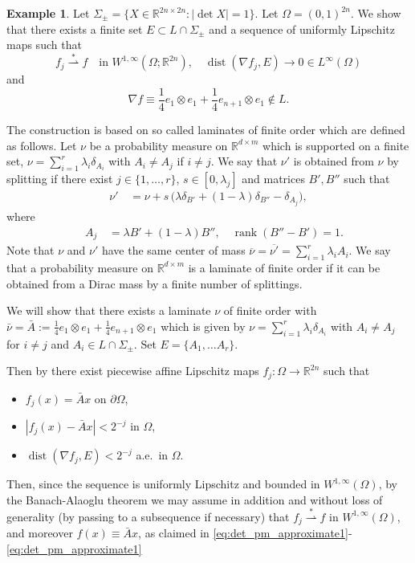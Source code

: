 \documentclass[titlepage]{amsart}
\numberwithin{equation}{section}
\theoremstyle{plain}
\theoremstyle{definition}
\newtheorem{example}[equation]{Example}
\theoremstyle{remark}
\newcommand{\dist}{\operatorname{dist}}
\newcommand{\R}{\mathbb{R}}
\newcommand{\rank}{\operatorname{rank}}
\newcommand{\g}{\nabla }
\begin{document}
\begin{example}  \label{ex:det_pm_approximate}
Let $\Sigma_\pm = \{ X \in \R^{2n \times 2n} : |\det X| = 1\}$. Let $\Omega = (0,1)^{2n}$. 
We show that there exists a finite set $E \subset L \cap \Sigma_\pm$ and a sequence of uniformly Lipschitz maps such that
\begin{equation}  \label{eq:det_pm_approximate1}  f_j \overset{*}{\rightharpoonup} f \quad \text{in $W^{1, \infty}(\Omega; \R^{2n})$}, 
\quad 
\dist(\g f_j, E) \to 0 \in L^\infty(\Omega)
\end{equation}
and 
\begin{equation} \label{eq:det_pm_approximate2} \g f \equiv \frac14 e_1 \otimes e_1 + \frac14 e_{n+1} \otimes e_1 \notin L.
\end{equation}

The construction is based on so called laminates of finite order which are defined as follows.
Let $\nu$ be a probability measure on $\R^{d \times m}$ which is supported on a finite set, $\nu = \sum_{i=1}^r \lambda_i \delta_{A_i}$
with $A_i \ne A_j$ if $i \ne j$. 
We say that $\nu'$ is obtained from $\nu$ by splitting if there exist  $j \in \{1, \ldots, r\}$, $s \in [0, \lambda_j]$ and 
matrices $B', B''$ such that 
\begin{align*}
\nu' & \, = \nu +  s  \, \big(  \lambda \delta_{B'} + (1- \lambda) \delta_{B''} - \delta_{A_j}  \big),
\end{align*}
where
\begin{align*}\quad A_j & \, = \lambda B' + (1-\lambda) B'', \quad \rank (B''-B') = 1.
\end{align*}
Note that $\nu$ and $\nu'$ have the same center of mass $\overline \nu = \overline{\nu'}  =\sum_{i=1}^r  \lambda_i A_i$.
We say that a probability measure on $\R^{d \times m}$ is a  laminate of finite order  if it can be obtained from a Dirac mass by a finite number of splittings.

We will show that there exists a laminate $\nu$ of finite order with $\bar \nu = 
 \bar A := \frac14 e_1 \otimes e_1 + \frac14 e_{n+1} \otimes e_1$
 which is given by 
$\nu = \sum_{i=1}^r \lambda_i \delta_{A_i}$ with $A_i \ne A_j$ for $i \ne j$ and $A_i \in L \cap \Sigma_\pm$. 
Set $E = \{ A_1, \ldots A_r\}$.

Then by \cite[Lemma 3.2]{muller_sverak03}  there exist  piecewise affine Lipschitz  maps
$f_j : \Omega \to \R^{2n}$ such that 
\begin{itemize}
    \item $f_j(x)=\bar{A}x$ on $\partial\Omega$,
    \item $|f_j(x)-\bar{A}x|<2^{-j}$ in $\Omega$,
    \item $\dist(\g f_j, E) < 2^{-j}$ a.e.~in $\Omega$.
\end{itemize}
Then, since the sequence is uniformly Lipschitz and bounded in $W^{1,\infty}(\Omega)$, by the Banach-Alaoglu theorem we may assume in addition and without loss of generality (by passing to a subsequence if necessary) that $f_j \overset{*}{\rightharpoonup} f$ in $W^{1, \infty}(\Omega)$, and moreover $f(x)\equiv \bar{A}x$, as claimed in  \eqref{eq:det_pm_approximate1}- \eqref{eq:det_pm_approximate1}


\end{example}
\end{document}
